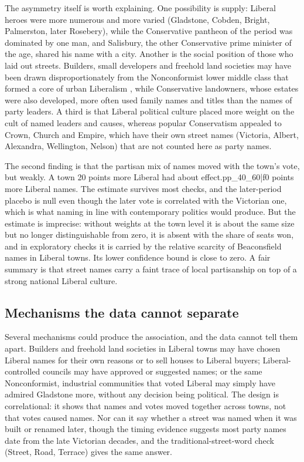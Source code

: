 \documentclass[11pt,a4paper]{article}
\begin{document}
The asymmetry itself is worth explaining. One possibility is supply: Liberal heroes were more numerous and more varied (Gladstone, Cobden, Bright, Palmerston, later Rosebery), while the Conservative pantheon of the period was dominated by one man, and Salisbury, the other Conservative prime minister of the age, shared his name with a city. Another is the social position of those who laid out streets. Builders, small developers and freehold land societies may have been drawn disproportionately from the Nonconformist lower middle class that formed a core of urban Liberalism \citep{vincent1966}, while Conservative landowners, whose estates were also developed, more often used family names and titles than the names of party leaders. A third is that Liberal political culture placed more weight on the cult of named leaders and causes, whereas popular Conservatism appealed to Crown, Church and Empire, which have their own street names (Victoria, Albert, Alexandra, Wellington, Nelson) that are not counted here as party names.

The second finding is that the partisan mix of names moved with the town's vote, but weakly. A town 20 points more Liberal had about {{effect.pp_40_60|f0}} points more Liberal names. The estimate survives most checks, and the later-period placebo is null even though the later vote is correlated with the Victorian one, which is what naming in line with contemporary politics would produce. But the estimate is imprecise: without weights at the town level it is about the same size but no longer distinguishable from zero, it is absent with the share of seats won, and in exploratory checks it is carried by the relative scarcity of Beaconsfield names in Liberal towns. Its lower confidence bound is close to zero. A fair summary is that street names carry a faint trace of local partisanship on top of a strong national Liberal culture.

\subsection{Mechanisms the data cannot separate}
Several mechanisms could produce the association, and the data cannot tell them apart. Builders and freehold land societies in Liberal towns may have chosen Liberal names for their own reasons or to sell houses to Liberal buyers; Liberal-controlled councils may have approved or suggested names; or the same Nonconformist, industrial communities that voted Liberal may simply have admired Gladstone more, without any decision being political. The design is correlational: it shows that names and votes moved together across towns, not that votes caused names. Nor can it say whether a street was named when it was built or renamed later, though the timing evidence suggests most party names date from the late Victorian decades, and the traditional-street-word check (Street, Road, Terrace) gives the same answer.
\end{document}
